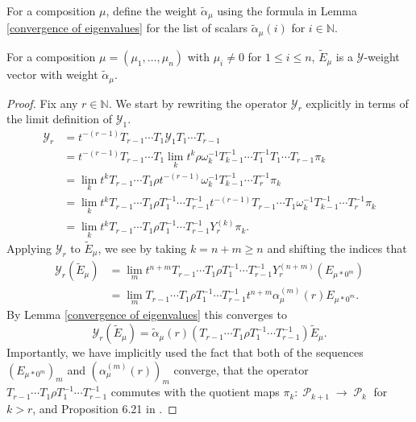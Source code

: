 \documentclass[ALCO,Unicode]{cedram}
\newcommand{\y}{{ \mathscr{Y} }}
\DeclareMathOperator{\sP}{\mathscr{P} }
\begin{document}
For a composition $\mu$, define the weight $\widetilde{\alpha}_{\mu}$ using the formula in Lemma \ref{convergence of eigenvalues} for the list of scalars  $\widetilde{\alpha}_{\mu}(i)$ for $i \in \mathbb{N}$.

\begin{lemm} \label{weight vector if nonzero parts}
For a composition $\mu = (\mu_1,\ldots,\mu_n)$ with $\mu_i \neq 0$ for $1\leq i \leq n$, $\widetilde{E}_{\mu}$ is a $\y$-weight vector with weight $\widetilde{\alpha}_{\mu}$. 
\end{lemm}

\begin{proof}
Fix any $r \in \mathbb{N}$. We start by rewriting the operator $\y_r$ explicitly in terms of the limit definition of $\y_1$.
\begin{align*}
\y_r &= t^{-(r-1)}T_{r-1}\cdots T_1 \y_1 T_1 \cdots T_{r-1}\\
&= t^{-(r-1)}T_{r-1}\cdots T_1 \lim_{k} t^{k} \rho \omega_k ^{-1} T_{k-1}^{-1}\cdots T_{1}^{-1}T_1\cdots T_{r-1} \pi_k \\
&= \lim_{k} t^{k} T_{r-1}\cdots T_1 \rho t^{-(r-1)} \omega_k ^{-1} T_{k-1}^{-1}\cdots T_{r}^{-1}\pi_k \\
&= \lim_{k} t^{k} T_{r-1}\cdots T_1 \rho T_1^{-1} \cdots T_{r-1}^{-1} t^{-(r-1)} T_{r-1} \cdots T_{1}  \omega_k ^{-1} T_{k-1}^{-1}\cdots T_{r}^{-1} \pi_k \\
&= \lim_{k} t^{k} T_{r-1}\cdots T_1 \rho T_1^{-1} \cdots T_{r-1}^{-1} Y_{r}^{(k)}\pi_k.
\end{align*}
Applying $\y_r$ to $\widetilde{E}_{\mu}$, we see by taking $k = n+m \geq n$ and shifting the indices that
\begin{align*}
\y_r(\widetilde{E}_{\mu}) &= \lim_{m} t^{n+m} T_{r-1}\cdots T_1 \rho T_1^{-1} \cdots T_{r-1}^{-1} Y_{r}^{(n+m)}(E_{\mu*0^{m}}) \\
&= \lim_{m} T_{r-1}\cdots T_1 \rho T_1^{-1} \cdots T_{r-1}^{-1}  t^{n+m} \alpha_{\mu}^{(m)}(r) E_{\mu*0^{m}}.
\end{align*}
By Lemma \ref{convergence of eigenvalues} this converges to 
$$ \y_r( \widetilde{E}_{\mu}) = \widetilde{\alpha}_{\mu}(r) (T_{r-1}\cdots T_1 \rho T_1^{-1}\cdots T_{r-1}^{-1}) \widetilde{E}_{\mu} .$$ 
Importantly, we have implicitly used the fact that both of the sequences $(E_{\mu*0^{m}})_{m}$ and $(\alpha_{\mu}^{(m)}(r))_{m}$ converge, that the operator $T_{r-1}\cdots T_1 \rho T_1^{-1}\cdots T_{r-1}^{-1}$ commutes with the quotient maps $\pi_k: \sP_{k+1} \rightarrow \sP_{k}$ for $k> r$, and Proposition 6.21 in \cite{Ion_2022}.

\end{proof}
\end{document}
